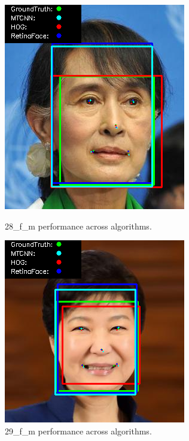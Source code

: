 \documentclass{l4proj}
\begin{document}
\begin{appendices}
\begin{figure}[h!]
  \centering
  \begin{minipage}{0.49\textwidth}
    \centering
     \includegraphics[width=\textwidth]{images/appendix/28.png}
    \caption{28\_f\_m performance across algorithms.}
    \label{whoopi_result}
  \end{minipage}
    \hfill
    \begin{minipage}{0.49\textwidth}
    \centering
     \includegraphics[width=\textwidth]{images/appendix/29.png}
    \caption{29\_f\_m performance across algorithms.}
    \label{whoopi_result}
  \end{minipage}
\end{figure}


\end{appendices}
\end{document}
